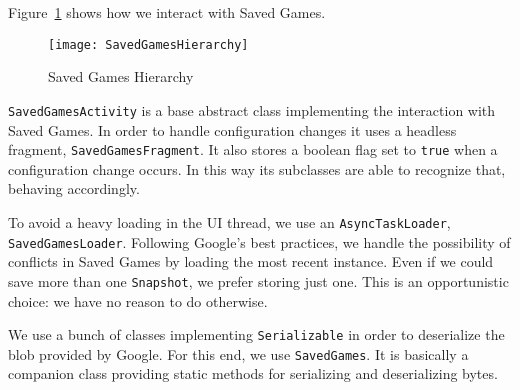 Figure~\ref{fig:saved-games-hierarchy} shows how we interact with Saved Games.
\begin{figure}
	\centering
	\texttt{[image: SavedGamesHierarchy]}
	\caption{Saved Games Hierarchy}
	\label{fig:saved-games-hierarchy}
\end{figure}

\texttt{SavedGamesActivity} is a base abstract class implementing the interaction with Saved Games. In order to handle configuration changes it uses a headless fragment, \texttt{SavedGamesFragment}. It also stores a boolean flag set to \texttt{true} when a configuration change occurs. In this way its subclasses are able to recognize that, behaving accordingly. 

To avoid a heavy loading in the UI thread, we use an \texttt{AsyncTaskLoader}, \texttt{SavedGamesLoader}. Following Google's best practices, we handle the possibility of conflicts in Saved Games by loading the most recent instance. Even if we could save more than one \texttt{Snapshot}, we prefer storing just one. This is an opportunistic choice: we have no reason to do otherwise.

We use a bunch of classes implementing \texttt{Serializable} in order to deserialize the blob provided by Google. For this end, we use \texttt{SavedGames}. It is basically a companion class providing static methods for serializing and deserializing bytes. 
